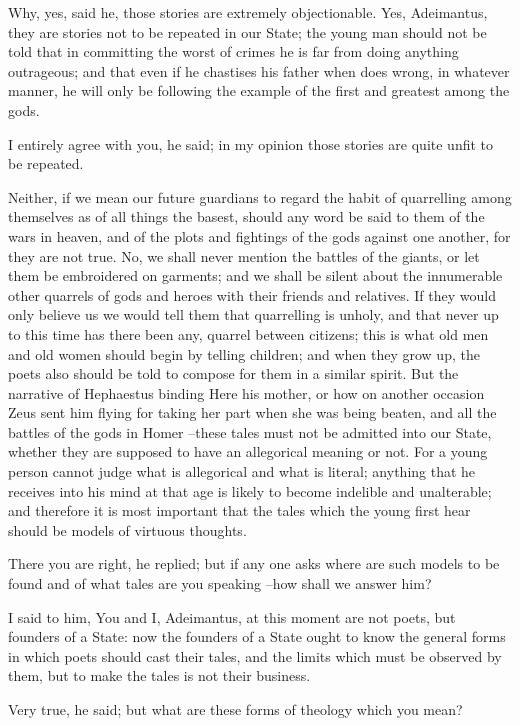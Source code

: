 Why, yes, said he, those stories are extremely objectionable.
Yes, Adeimantus, they are stories not to be repeated in our State; the young man should not be told that in committing the worst of crimes he is far from doing anything outrageous; and that even if he chastises his father when does wrong, in whatever manner, he will only be following the example of the first and greatest among the gods.

I entirely agree with you, he said; in my opinion those stories are quite unfit to be repeated.

Neither, if we mean our future guardians to regard the habit of quarrelling among themselves as of all things the basest, should any word be said to them of the wars in heaven, and of the plots and fightings of the gods against one another, for they are not true. No, we shall never mention the battles of the giants, or let them be embroidered on garments; and we shall be silent about the innumerable other quarrels of gods and heroes with their friends and relatives. If they would only believe us we would tell them that quarrelling is unholy, and that never up to this time has there been any, quarrel between citizens; this is what old men and old women should begin by telling children; and when they grow up, the poets also should be told to compose for them in a similar spirit. But the narrative of Hephaestus binding Here his mother, or how on another occasion Zeus sent him flying for taking her part when she was being beaten, and all the battles of the gods in Homer --these tales must not be admitted into our State, whether they are supposed to have an allegorical meaning or not. For a young person cannot judge what is allegorical and what is literal; anything that he receives into his mind at that age is likely to become indelible and unalterable; and therefore it is most important that the tales which the young first hear should be models of virtuous thoughts.

There you are right, he replied; but if any one asks where are such models to be found and of what tales are you speaking --how shall we answer him?

I said to him, You and I, Adeimantus, at this moment are not poets, but founders of a State: now the founders of a State ought to know the general forms in which poets should cast their tales, and the limits which must be observed by them, but to make the tales is not their business.

Very true, he said; but what are these forms of theology which you mean?

